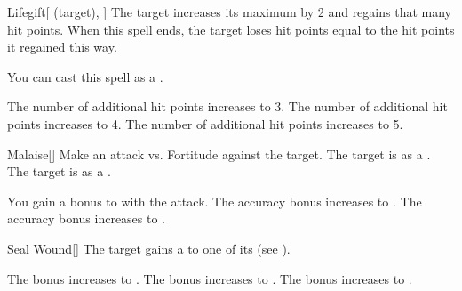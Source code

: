 \lowercase{\hypertarget{spell:Lifegift}{}}\label{spell:Lifegift}
\begin{attuneability}[Rank 1]{\hypertarget{spell:Lifegift}{Lifegift}}[ (target), ]
The target increases its maximum  by 2 and regains that many hit points.
When this spell ends, the target loses hit points equal to the hit points it regained this way.

You can cast this spell as a .

\rankline
{} The number of additional hit points increases to 3.
 The number of additional hit points increases to 4.
 The number of additional hit points increases to 5.
\end{attuneability}
\vspace{0.25em}



\lowercase{\hypertarget{spell:Malaise}{}}\label{spell:Malaise}
\begin{freeability}[Rank 1]{\hypertarget{spell:Malaise}{Malaise}}[]
Make an attack vs. Fortitude against the target.
\hit The target is  as a .
\crit The target is  as a .

\rankline
{} You gain a  bonus to  with the attack.
 The accuracy bonus increases to .
 The accuracy bonus increases to .
\end{freeability}
\vspace{0.25em}



\lowercase{\hypertarget{spell:Seal Wound}{}}\label{spell:Seal Wound}
\begin{freeability}[Rank 1]{\hypertarget{spell:Seal Wound}{Seal Wound}}[]
The target gains a   to one of its  (see ).

\rankline
{} The bonus increases to .
 The bonus increases to .
 The bonus increases to .
\end{freeability}
\vspace{0.25em}



